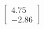 \documentclass[preview]{standalone}
\begin{document}
\begin{align*}
\begin{bmatrix} 4.75 \\ -2.86 \end{bmatrix}
\end{align*}
\end{document}
